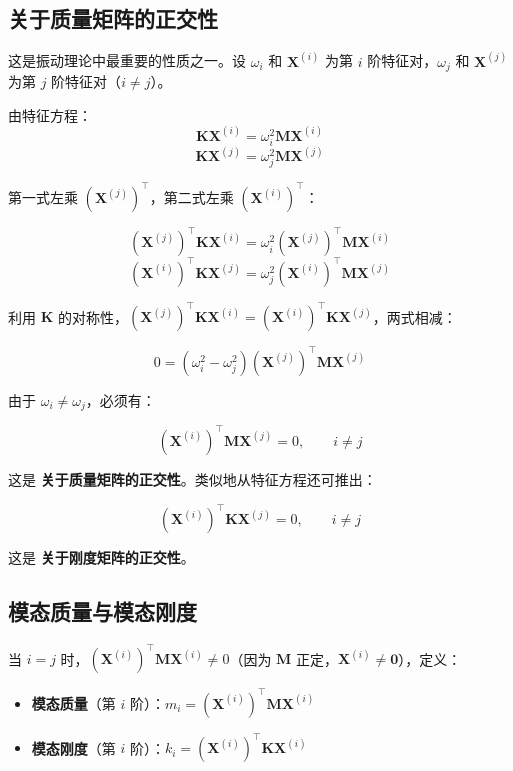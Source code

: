 \subsection{关于质量矩阵的正交性}

这是振动理论中最重要的性质之一。设 $\omega_i$ 和 $\mathbf{X}^{(i)}$ 为第 $i$ 阶特征对，$\omega_j$ 和 $\mathbf{X}^{(j)}$ 为第 $j$ 阶特征对（$i \neq j$）。

由特征方程：
\[
\mathbf{K}\mathbf{X}^{(i)} = \omega_i^2 \mathbf{M}\mathbf{X}^{(i)}
\]
\[
\mathbf{K}\mathbf{X}^{(j)} = \omega_j^2 \mathbf{M}\mathbf{X}^{(j)}
\]

第一式左乘 $(\mathbf{X}^{(j)})^{\top}$，第二式左乘 $(\mathbf{X}^{(i)})^{\top}$：

\[
(\mathbf{X}^{(j)})^{\top} \mathbf{K}\mathbf{X}^{(i)} = \omega_i^2 (\mathbf{X}^{(j)})^{\top} \mathbf{M}\mathbf{X}^{(i)}
\]
\[
(\mathbf{X}^{(i)})^{\top} \mathbf{K}\mathbf{X}^{(j)} = \omega_j^2 (\mathbf{X}^{(i)})^{\top} \mathbf{M}\mathbf{X}^{(j)}
\]

利用 $\mathbf{K}$ 的对称性，$(\mathbf{X}^{(j)})^{\top}\mathbf{K}\mathbf{X}^{(i)} = (\mathbf{X}^{(i)})^{\top}\mathbf{K}\mathbf{X}^{(j)}$，两式相减：

\[
0 = (\omega_i^2 - \omega_j^2) (\mathbf{X}^{(j)})^{\top} \mathbf{M}\mathbf{X}^{(j)}
\]

由于 $\omega_i \neq \omega_j$，必须有：

\begin{myformula}
\[
(\mathbf{X}^{(i)})^{\top} \mathbf{M} \mathbf{X}^{(j)} = 0, \qquad i \neq j
\]
\end{myformula}

这是 \textbf{关于质量矩阵的正交性}。类似地从特征方程还可推出：

\begin{myformula}
\[
(\mathbf{X}^{(i)})^{\top} \mathbf{K} \mathbf{X}^{(j)} = 0, \qquad i \neq j
\]
\end{myformula}

这是 \textbf{关于刚度矩阵的正交性}。

\subsection{模态质量与模态刚度}

当 $i = j$ 时，$(\mathbf{X}^{(i)})^{\top}\mathbf{M}\mathbf{X}^{(i)} \neq 0$（因为 $\mathbf{M}$ 正定，$\mathbf{X}^{(i)} \neq \mathbf{0}$），定义：

\begin{itemize}
\item \textbf{模态质量}（第 $i$ 阶）：$m_i = (\mathbf{X}^{(i)})^{\top} \mathbf{M} \mathbf{X}^{(i)}$
\item \textbf{模态刚度}（第 $i$ 阶）：$k_i = (\mathbf{X}^{(i)})^{\top} \mathbf{K} \mathbf{X}^{(i)}$
\end{itemize}

